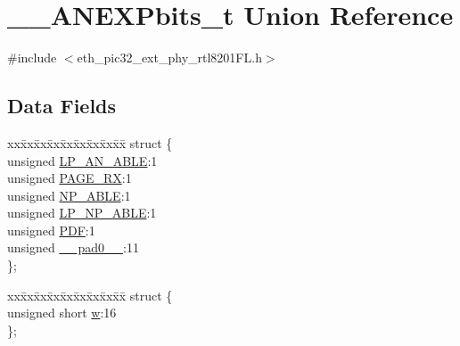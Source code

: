 \hypertarget{union_____a_n_e_x_pbits__t}{}\section{\+\_\+\+\_\+\+A\+N\+E\+X\+Pbits\+\_\+t Union Reference}
\label{union_____a_n_e_x_pbits__t}


{\ttfamily \#include $<$eth\+\_\+pic32\+\_\+ext\+\_\+phy\+\_\+rtl8201\+F\+L.\+h$>$}

\subsection*{Data Fields}
\begin{DoxyCompactItemize}
\item 
\begin{tabbing}
xx\=xx\=xx\=xx\=xx\=xx\=xx\=xx\=xx\=\kill
struct \{\\
\>unsigned \hyperlink{union_____a_n_e_x_pbits__t_af491690ecb970d54e41753af685c88c4}{LP\_AN\_ABLE}:1\\
\>unsigned \hyperlink{union_____a_n_e_x_pbits__t_a3495443e84affeecbad3e1d2d8080a70}{PAGE\_RX}:1\\
\>unsigned \hyperlink{union_____a_n_e_x_pbits__t_a4502f03b3664f0c1b02bfbfdae50f349}{NP\_ABLE}:1\\
\>unsigned \hyperlink{union_____a_n_e_x_pbits__t_a70459ea04fc22f1abc90777a1da04b40}{LP\_NP\_ABLE}:1\\
\>unsigned \hyperlink{union_____a_n_e_x_pbits__t_a8c5bd7f969fa0ca92985a42453435c4f}{PDF}:1\\
\>unsigned \hyperlink{union_____a_n_e_x_pbits__t_adf71f3d8410c1f1dbbc96680a92c49af}{\_\_pad0\_\_}:11\\
\}; \\

\end{tabbing}\item 
\begin{tabbing}
xx\=xx\=xx\=xx\=xx\=xx\=xx\=xx\=xx\=\kill
struct \{\\
\>unsigned short \hyperlink{union_____a_n_e_x_pbits__t_a160850a4684a3e82c2323033964f2e98}{w}:16\\
\}; \\


\end{tabbing}
\end{DoxyCompactItemize}
